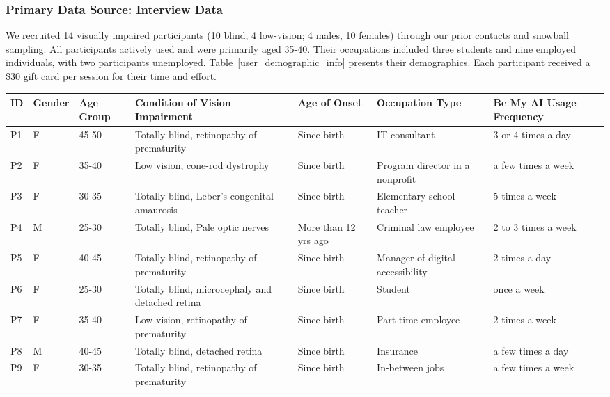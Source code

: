 \subsubsection{Primary Data Source: Interview Data}
We recruited 14 visually impaired participants (10 blind, 4 low-vision; 4 males, 10 females) through our prior contacts and snowball sampling.  
All participants actively used \bma{} and were primarily aged 35-40. Their occupations included three students and nine employed individuals, with two participants unemployed. 
Table~\ref{user_demographic_info} presents their demographics. 
Each participant received a \$30 gift card per session for their time and effort. 




\begin{table*}[]
\small
\caption{Participants' demographics.}
\label{user_demographic_info}
\begin{tabular}{p{0.3cm}p{0.8cm}p{0.8cm}p{4.8cm}p{2.8cm}p{3cm}p{2.1cm}}
\toprule
\textbf{ID} & \textbf{Gender} & \textbf{Age Group} & \textbf{Condition of Vision Impairment} & \textbf{Age of Onset} & \textbf{Occupation Type} & \textbf{Be My AI Usage Frequency} \\ \toprule
P1 & F & 45-50 & Totally blind, retinopathy of prematurity & Since birth & IT consultant &  3 or 4 times a day \\ \hline
P2 & F & 35-40 & Low vision, cone-rod dystrophy & Since birth & Program director in a nonprofit &  a few times a week \\ \hline
P3 & F & 30-35 & Totally blind, Leber's congenital amaurosis & Since birth & Elementary school teacher & 5 times a week \\ \hline
P4 & M & 25-30 & Totally blind, Pale optic nerves & More than 12 yrs ago & Criminal law employee & 2 to 3 times a week \\ \hline
P5 & F & 40-45 & Totally blind, retinopathy of prematurity & Since birth & Manager of digital accessibility & 2 times a day \\ \hline
P6 & F & 25-30 & Totally blind, microcephaly and detached retina & Since birth & Student & once a week \\ \hline
P7 & F & 35-40 & Low vision, retinopathy of prematurity & Since birth & Part-time employee &  2 times a week \\ \hline
P8 & M & 40-45 & Totally blind, detached retina & Since birth & Insurance & a few times a day \\ \hline
P9 & F & 30-35 & Totally blind, retinopathy of prematurity & Since birth & In-between jobs & a few times a week \\ \hline

\end{tabular}
\end{table*}

